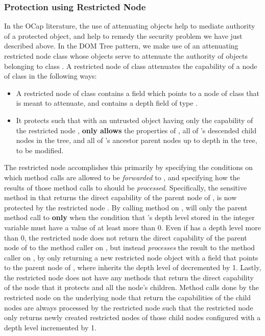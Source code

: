 \documentclass[a4paper,11pt,twoside]{article}
\begin{document}
\subsubsection{Protection using Restricted Node}\label{domrenode}

In the OCap literature, the use of attenuating objects help to mediate authority of a protected object, and help to remedy the security problem we have just described above. In the DOM Tree pattern, we make use of an attenuating restricted node class  whose objects serve to attenuate the authority of objects belonging to class . A restricted node  of class  attenuates the capability of a node of class  in the following ways:

\begin{itemize}
\item A restricted node  of class  contains a field which points to a node  of class  that  is meant to attenuate, and contains a depth field  of type . 
\item  It protects  such that with an untrusted object having only the capability of the restricted node ,  \textbf{only allows} the properties of , all of 's descended child nodes in the tree, and all of 's ancestor parent nodes up to depth  in the tree, to be modified.
\end{itemize}

The restricted node accomplishes this primarily by specifying the conditions on which method calls are allowed to be \textit{forwarded} to , and specifying how the results of those method calls to  should be \textit{processed}. Specifically, the sensitive  method in  that returns the direct capability of the parent node of , is now protected by the restricted node . By calling  method on ,  will only  the parent method call to  \textbf{only} when the condition that 's depth level stored in the integer variable  must have a value of at least more than 0. Even if  has a depth level more than 0, the restricted node does not return the direct capability of the parent node of  to the method caller on , but instead \textit{processes} the result to the method caller on , by only returning a new restricted node object  with a field that points to the parent node of , where  inherits the depth level of  decremented by 1. Lastly, the restricted node does not have any methods that return the direct capability of the node that it protects and all the node's children. Method calls done by the restricted node on the underlying node that return the capabilities of the child nodes are always processed by the restricted node such that the restricted node only returns newly created restricted nodes of those child nodes configured with a depth level incremented by 1.
\end{document}
